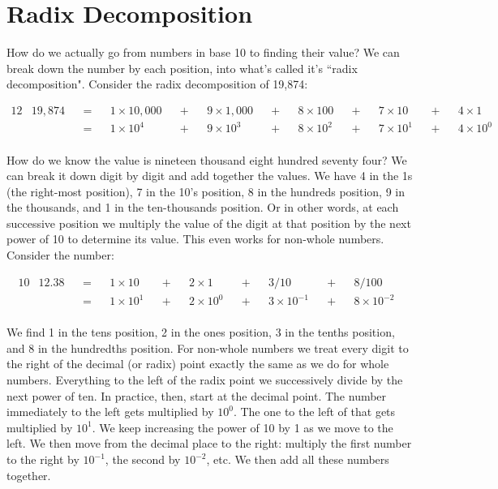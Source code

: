 \section{Radix Decomposition}
How do we actually go from numbers in base 10 to finding their value? We can break
down the number by each position, into what's called it's ``radix decomposition". Consider the radix decomposition of 19,874:

\begin{alignat*}{12}
& 19,874 &&=&& 1\times10,000 &&+&& 9\times1,000 &&+&& 8\times100  &&+&& 7\times10   &&+&& 4\times1    &\\
&             &&=&& 1\times10^4   &&+&& 9\times10^3  &&+&& 8\times10^2 &&+&& 7\times10^1 &&+&& 4\times10^0 &\\
\end{alignat*}

How do we know the value is nineteen thousand eight hundred seventy four? We can
break it down digit by digit and add together the values. We have 4 in the 1s (the
right-most position), 7 in the 10’s position, 8 in the hundreds position, 9 in the
thousands, and 1 in the ten-thousands position. Or in other words, at each
successive position we multiply the value of the digit at that position by the next
power of 10 to determine its value. This even works for non-whole numbers. Consider
the number:

\begin{alignat*}{10}
& 12.38 &&=&& 1\times10   &&+&& 2\times1    &&+&& 3/10           &&+&& 8/100            &\\
&            &&=&& 1\times10^1 &&+&& 2\times10^0 &&+&& 3\times10^{-1} &&+&& 8 \times 10^{-2} &\\
\end{alignat*}

We find 1 in the tens position, 2 in the ones position, 3 in the tenths position,
and 8 in the hundredths position. For non-whole numbers we treat every digit to the
right of the decimal (or radix) point exactly the same as we do for whole numbers.
Everything to the left of the radix point we successively divide by the next power
of ten. In practice, then, start at the decimal point. The number immediately to the left gets multiplied by $10^0$. The one to the left of that gets multiplied by $10^1$. We keep increasing the power of 10 by 1 as we move to the left. We then move from the decimal place to the right: multiply the first number to the right by $10^{-1}$, the second by $10^{-2}$, etc. We then add all these numbers together. 

